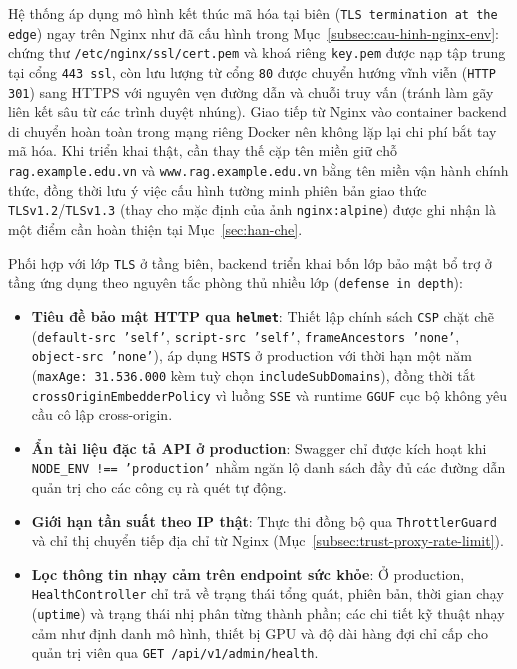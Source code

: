 Hệ thống áp dụng mô hình kết thúc mã hóa tại biên (\texttt{TLS termination at the edge}) ngay trên Nginx như đã cấu hình trong Mục~\ref{subsec:cau-hinh-nginx-env}: chứng thư \texttt{/\allowbreak{}etc/\allowbreak{}nginx/\allowbreak{}ssl/\allowbreak{}cert.\allowbreak{}pem} và khoá riêng \texttt{key.\allowbreak{}pem} được nạp tập trung tại cổng \texttt{443 ssl}, còn lưu lượng từ cổng \texttt{80} được chuyển hướng vĩnh viễn (\texttt{HTTP 301}) sang HTTPS với nguyên vẹn đường dẫn và chuỗi truy vấn (tránh làm gãy liên kết sâu từ các trình duyệt nhúng). Giao tiếp từ Nginx vào container backend di chuyển hoàn toàn trong mạng riêng Docker nên không lặp lại chi phí bắt tay mã hóa. Khi triển khai thật, cần thay thế cặp tên miền giữ chỗ \texttt{rag.\allowbreak{}example.\allowbreak{}edu.\allowbreak{}vn} và \texttt{www.\allowbreak{}rag.\allowbreak{}example.\allowbreak{}edu.\allowbreak{}vn} bằng tên miền vận hành chính thức, đồng thời lưu ý việc cấu hình tường minh phiên bản giao thức \texttt{TLSv1.\allowbreak{}2}/\texttt{TLSv1.\allowbreak{}3} (thay cho mặc định của ảnh \texttt{nginx:\allowbreak{}alpine}) được ghi nhận là một điểm cần hoàn thiện tại Mục~\ref{sec:han-che}.

Phối hợp với lớp \texttt{TLS} ở tầng biên, backend triển khai bốn lớp bảo mật bổ trợ ở tầng ứng dụng theo nguyên tắc phòng thủ nhiều lớp (\texttt{defense in depth}):
\begin{itemize}[label=--]
    \item \textbf{Tiêu đề bảo mật HTTP qua \texttt{helmet}}: Thiết lập chính sách \texttt{CSP} chặt chẽ (\texttt{default-\allowbreak{}src 'self'}, \texttt{script-\allowbreak{}src 'self'}, \texttt{frame\allowbreak{}Ancestors 'none'}, \texttt{object-\allowbreak{}src 'none'}), áp dụng \texttt{HSTS} ở production với thời hạn một năm (\texttt{maxAge:\allowbreak{} 31.536.000} kèm tuỳ chọn \texttt{include\allowbreak{}SubDomains}), đồng thời tắt \texttt{crossOrigin\allowbreak{}Embedder\allowbreak{}Policy} vì luồng \texttt{SSE} và runtime \texttt{GGUF} cục bộ không yêu cầu cô lập cross-origin.
    \item \textbf{Ẩn tài liệu đặc tả API ở production}: Swagger chỉ được kích hoạt khi \texttt{NODE\_\allowbreak{}ENV !== 'production'} nhằm ngăn lộ danh sách đầy đủ các đường dẫn quản trị cho các công cụ rà quét tự động.
    \item \textbf{Giới hạn tần suất theo IP thật}: Thực thi đồng bộ qua \texttt{ThrottlerGuard} và chỉ thị chuyển tiếp địa chỉ từ Nginx (Mục~\ref{subsec:trust-proxy-rate-limit}).
    \item \textbf{Lọc thông tin nhạy cảm trên endpoint sức khỏe}: Ở production, \texttt{HealthController} chỉ trả về trạng thái tổng quát, phiên bản, thời gian chạy (\texttt{uptime}) và trạng thái nhị phân từng thành phần; các chi tiết kỹ thuật nhạy cảm như định danh mô hình, thiết bị GPU và độ dài hàng đợi chỉ cấp cho quản trị viên qua \texttt{GET /\allowbreak{}api/\allowbreak{}v1/\allowbreak{}admin/\allowbreak{}health}.
\end{itemize}

